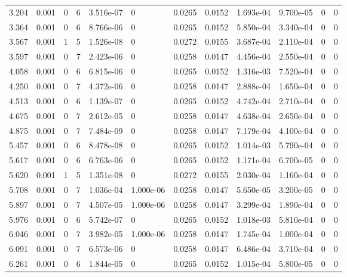 \documentclass[preview]{standalone}
\begin{document}
{{\begin{tabular}{L{1.2cm}C{1.2cm} C{0.3cm}C{0.5cm} C{1.4cm}C{1.4cm} C{1.4cm}C{1.4cm} C{1.6cm}C{1.6cm} C{1.6cm}C{1.6cm}}
  3.204  &  0.001  & 0     &  6 &  3.516e-07  & 0  &  0.0265&   0.0152& 1.693e-04 & 9.700e-05   &  0 & 0  \\ 
  3.364  &  0.001  & 0     &  6 &  8.766e-06  & 0  &  0.0265&   0.0152& 5.850e-04 & 3.340e-04   &  0 & 0  \\ 
  3.567  &  0.001  & 1     &  5 &  1.526e-08  & 0  &  0.0272&   0.0155& 3.687e-04 & 2.110e-04   &  0 & 0  \\ 
  3.597  &  0.001  & 0     &  7 &  2.423e-06  & 0  &  0.0258&   0.0147& 4.456e-04 & 2.550e-04   &  0 & 0  \\ 
  4.058  &  0.001  & 0     &  6 &  6.815e-06  & 0  &  0.0265&   0.0152& 1.316e-03 & 7.520e-04   &  0 & 0  \\ 
  4.250  &  0.001  & 0     &  7 &  4.372e-06  & 0  &  0.0258&   0.0147& 2.888e-04 & 1.650e-04   &  0 & 0  \\ 
  4.513  &  0.001  & 0     &  6 &  1.139e-07  & 0  &  0.0265&   0.0152& 4.742e-04 & 2.710e-04   &  0 & 0  \\ 
  4.675  &  0.001  & 0     &  7 &  2.612e-05  & 0  &  0.0258&   0.0147& 4.638e-04 & 2.650e-04   &  0 & 0  \\ 
  4.875  &  0.001  & 0     &  7 &  7.484e-09  & 0  &  0.0258&   0.0147& 7.179e-04 & 4.100e-04   &  0 & 0  \\ 
  5.457  &  0.001  & 0     &  6 &  8.478e-08  & 0  &  0.0265&   0.0152& 1.014e-03 & 5.790e-04   &  0 & 0  \\ 
  5.617  &  0.001  & 0     &  6 &  6.763e-06  & 0  &  0.0265&   0.0152& 1.171e-04 & 6.700e-05   &  0 & 0  \\ 
  5.620  &  0.001  & 1     &  5 &  1.351e-08  & 0  &  0.0272&   0.0155& 2.030e-04 & 1.160e-04   &  0 & 0  \\ 
  5.708  &  0.001  & 0     &  7 &  1.036e-04  & 1.000e-06  &  0.0258&   0.0147& 5.650e-05 & 3.200e-05   &  0 & 0  \\ 
  5.897  &  0.001  & 0     &  7 &  4.507e-05  & 1.000e-06  &  0.0258&   0.0147& 3.299e-04 & 1.890e-04   &  0 & 0  \\ 
  5.976  &  0.001  & 0     &  6 &  5.742e-07  & 0  &  0.0265&   0.0152& 1.018e-03 & 5.810e-04   &  0 & 0  \\ 
  6.046  &  0.001  & 0     &  7 &  3.982e-05  & 1.000e-06  &  0.0258&   0.0147& 1.745e-04 & 1.000e-04   &  0 & 0  \\ 
  6.091  &  0.001  & 0     &  7 &  6.573e-06  & 0  &  0.0258&   0.0147& 6.486e-04 & 3.710e-04   &  0 & 0  \\ 
  6.261  &  0.001  & 0     &  6 &  1.844e-05  & 0  &  0.0265&   0.0152& 1.015e-04 & 5.800e-05   &  0 & 0  \\ 

\end{tabular}}}
\end{document}
